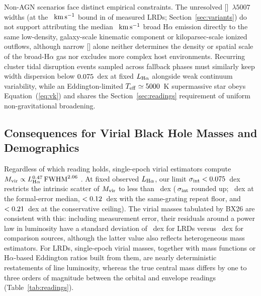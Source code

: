 \documentclass[twocolumn,linenumbers]{aastex701}
\newcommand{\Ha}{H$\alpha$}
\newcommand{\kms}{\ensuremath{{\rm km\,s^{-1}}}}
\newcommand{\sigint}{\sigma_{\rm int}}
\newcommand{\LHa}{L_{\rm H\alpha}}
\newcommand{\Teff}{T_{\rm eff}}
\newcommand{\Mvir}{M_{\rm vir}}
\newcommand{\BX}{BX26}
\begin{document}
Non-AGN scenarios face distinct empirical constraints.
The unresolved []~$\lambda5007$ widths (at the \wnarLo{}~\kms{} bound in \NOIIIUnres{} of \NOIIIMeas{} measured LRDs; Section~\ref{sec:variants}) do not support attributing the median \WLRDmed{}~\kms{} broad \Ha{} emission directly to the same low-density, galaxy-scale kinematic component \citep[cf.][]{Baggen2024} or kiloparsec-scale ionized outflows, although narrow [] alone neither determines the density or spatial scale of the broad-\Ha{} gas nor excludes more complex host environments.
Recurring cluster tidal disruption events sampled across fallback phases \citep{Bellovary2025} must similarly keep width dispersion below $0.075{}$~dex at fixed $\LHa$ alongside weak continuum variability, while an Eddington-limited $\Teff\simeq5000$~K supermassive star \citep{NandalLoeb2026} obeys Equation~(\ref{eq:vk}) and shares the Section~\ref{sec:readings} requirement of uniform non-gravitational broadening.

\subsection{Consequences for Virial Black Hole Masses and Demographics} \label{sec:mvir}

Regardless of which reading holds, single-epoch virial estimators compute $\Mvir\propto\LHa^{\virL{}}\,{\rm FWHM}^{\virW{}}$ \citep[][with $f_{\rm vir}=1.08$, $k=\kVir{}$ from \citealt{ReinesVolonteri2015}]{Reines2013}.
At fixed observed $\LHa$, our limit $\sigint<\FsigUp{}$~dex restricts the intrinsic scatter of $\Mvir$ to less than \sigMvir{}~dex (\virW{}\,$\sigint$ rounded up; \sigMvirMed{}~dex at the formal-error median, $<0.12{}$~dex with the same-grating repeat floor, and $<0.21{}$~dex at the conservative ceiling).
The virial masses tabulated by \BX{} are consistent with this: including measurement error, their residuals around a power law in luminosity have a standard deviation of \XresM{}~dex for LRDs versus \XresMo{}~dex for comparison sources, although the latter value also reflects heterogeneous mass estimators.
For LRDs, single-epoch virial masses, together with mass functions or \Ha{}-based Eddington ratios built from them, are nearly deterministic restatements of line luminosity, whereas the true central mass differs by one to three orders of magnitude between the orbital and envelope readings (Table~\ref{tab:readings}).
\end{document}
